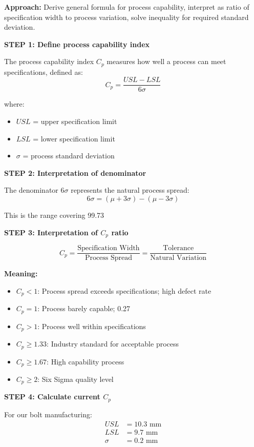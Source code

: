 \documentclass[12pt]{article}
\begin{document}
\begin{solution}

\textbf{Approach:} Derive general formula for process capability, interpret as ratio of specification width to process variation, solve inequality for required standard deviation.

\textbf{STEP 1: Define process capability index}

The process capability index $C_p$ measures how well a process can meet specifications, defined as:
\[
C_p = \frac{USL - LSL}{6\sigma}
\]

where:
\begin{itemize}
    \item $USL$ = upper specification limit
    \item $LSL$ = lower specification limit
    \item $\sigma$ = process standard deviation
\end{itemize}

\textbf{STEP 2: Interpretation of denominator}

The denominator $6\sigma$ represents the natural process spread:
\[
6\sigma = (\mu + 3\sigma) - (\mu - 3\sigma)
\]

This is the range covering 99.73%

\textbf{STEP 3: Interpretation of $C_p$ ratio}

\[
C_p = \frac{\text{Specification Width}}{\text{Process Spread}} = \frac{\text{Tolerance}}{\text{Natural Variation}}
\]

\textbf{Meaning:}
\begin{itemize}
    \item $C_p < 1$: Process spread exceeds specifications; high defect rate
    \item $C_p = 1$: Process barely capable; 0.27%
    \item $C_p > 1$: Process well within specifications
    \item $C_p \geq 1.33$: Industry standard for acceptable process
    \item $C_p \geq 1.67$: High capability process
    \item $C_p \geq 2$: Six Sigma quality level
\end{itemize}

\textbf{STEP 4: Calculate current $C_p$}

For our bolt manufacturing:
\begin{align*}
USL &= 10.3 \text{ mm} \\
LSL &= 9.7 \text{ mm} \\
\sigma &= 0.2 \text{ mm}
\end{align*}


\end{solution}
\end{document}
